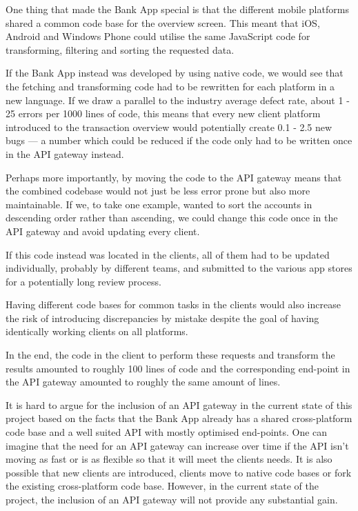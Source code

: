 \documentclass{cslthse-msc}
\begin{document}
One thing that made the Bank App special is that the different mobile platforms shared a common code base for the overview screen. This meant that iOS, Android and Windows Phone could utilise the same JavaScript code for transforming, filtering and sorting the requested data.

If the Bank App instead was developed by using native code, we would see that the fetching and transforming code had to be rewritten for each platform in a new language. If we draw a parallel to the industry average defect rate, about 1 - 25 errors per 1000 lines of code\cite{code_complete}, this means that every new client platform introduced to the transaction overview would potentially create 0.1 - 2.5 new bugs --- a number which could be reduced if the code only had to be written once in the API gateway instead.

Perhaps more importantly, by moving the code to the API gateway means that the combined codebase would not just be less error prone but also more maintainable. If we, to take one example, wanted to sort the accounts in descending order rather than ascending, we could change this code once in the API gateway and avoid updating every client. 

If this code instead was located in the clients, all of them had to be updated individually, probably by different teams, and submitted to the various app stores for a potentially long review process.

Having different code bases for common tasks in the clients would also increase the risk of introducing discrepancies by mistake despite the goal of having identically working clients on all platforms.

In the end, the code in the client to perform these requests and transform the results amounted to roughly 100 lines of code and the corresponding end-point in the API gateway amounted to roughly the same amount of lines.

It is hard to argue for the inclusion of an API gateway in the current state of this project based on the facts that the Bank App already has a shared cross-platform code base and a well suited API with mostly optimised end-points. One can imagine that the need for an API gateway can increase over time if the API isn't moving as fast or is as flexible so that it will meet the clients needs. It is also possible that new clients are introduced, clients move to native code bases or fork the existing cross-platform code base. However, in the current state of the project, the inclusion of an API gateway will not provide any substantial gain.
\end{document}
